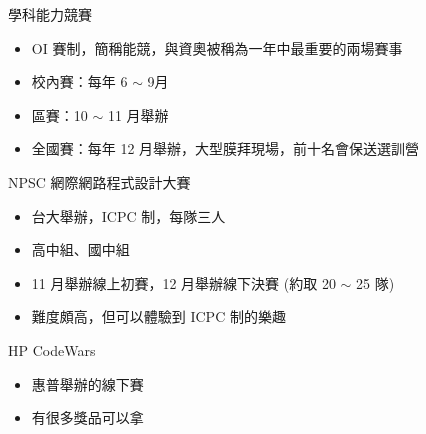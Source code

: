 \documentclass[aspectratio=169]{beamer}
\begin{document}
	\begin{frame}{學科能力競賽}
		\begin{itemize}
			\item OI 賽制，簡稱能競，與資奧被稱為一年中最重要的兩場賽事
			\item 校內賽：每年 6 $\sim$ 9月
			\item 區賽：10 $\sim$ 11 月舉辦
			\item 全國賽：每年 12 月舉辦，大型膜拜現場，前十名會保送選訓營
		\end{itemize}
	\end{frame}
	
	\begin{frame}{NPSC 網際網路程式設計大賽}
		\begin{itemize}
			\item<1-> 台大舉辦，ICPC 制，每隊三人
			\item<2-> 高中組、國中組
			\item<3-> 11 月舉辦線上初賽，12 月舉辦線下決賽 (約取 20 $\sim$ 25 隊)
			\item<4-> 難度頗高，但可以體驗到 ICPC 制的樂趣
		\end{itemize}
	\end{frame}

	\begin{frame}{HP CodeWars}
		\begin{itemize}
			\item<1-> 惠普舉辦的線下賽
			\item<2-> 有很多獎品可以拿
		\end{itemize}
	\end{frame}
\end{document}
